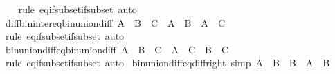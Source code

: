 \begin{isabellebody}
%
\isadelimproof
\ \ %
\endisadelimproof
%
\isatagproof
{}\isamarkupfalse%
\ {\isacharparenleft}{\kern0pt}rule\ eq{\isacharunderscore}{\kern0pt}if{\isacharunderscore}{\kern0pt}subset{\isacharunderscore}{\kern0pt}if{\isacharunderscore}{\kern0pt}subset{\isacharparenright}{\kern0pt}\ auto%
\endisatagproof
{\isafoldproof}%
%
\isadelimproof
\isanewline
%
\endisadelimproof
\isanewline
{}\isamarkupfalse%
\ diff{\isacharunderscore}{\kern0pt}bin{\isacharunderscore}{\kern0pt}inter{\isacharunderscore}{\kern0pt}eq{\isacharunderscore}{\kern0pt}bin{\isacharunderscore}{\kern0pt}union{\isacharunderscore}{\kern0pt}diff{\isacharcolon}{\kern0pt}\ {\isachardoublequoteopen}A\ {\isasymsetminus}\ {\isacharparenleft}{\kern0pt}B\ {\isasyminter}\ C{\isacharparenright}{\kern0pt}\ {\isacharequal}{\kern0pt}\ {\isacharparenleft}{\kern0pt}A\ {\isasymsetminus}\ B{\isacharparenright}{\kern0pt}\ {\isasymunion}\ {\isacharparenleft}{\kern0pt}A\ {\isasymsetminus}\ C{\isacharparenright}{\kern0pt}{\isachardoublequoteclose}\isanewline
%
\isadelimproof
\ \ %
\endisadelimproof
%
\isatagproof
{}\isamarkupfalse%
\ {\isacharparenleft}{\kern0pt}rule\ eq{\isacharunderscore}{\kern0pt}if{\isacharunderscore}{\kern0pt}subset{\isacharunderscore}{\kern0pt}if{\isacharunderscore}{\kern0pt}subset{\isacharparenright}{\kern0pt}\ auto%
\endisatagproof
{\isafoldproof}%
%
\isadelimproof
\isanewline
%
\endisadelimproof
\isanewline
{}\isamarkupfalse%
\ bin{\isacharunderscore}{\kern0pt}union{\isacharunderscore}{\kern0pt}diff{\isacharunderscore}{\kern0pt}eq{\isacharunderscore}{\kern0pt}bin{\isacharunderscore}{\kern0pt}union{\isacharunderscore}{\kern0pt}diff{\isacharcolon}{\kern0pt}\ {\isachardoublequoteopen}{\isacharparenleft}{\kern0pt}A\ {\isasymunion}\ B{\isacharparenright}{\kern0pt}\ {\isasymsetminus}\ C\ {\isacharequal}{\kern0pt}\ {\isacharparenleft}{\kern0pt}A\ {\isasymsetminus}\ C{\isacharparenright}{\kern0pt}\ {\isasymunion}\ {\isacharparenleft}{\kern0pt}B\ {\isasymsetminus}\ C{\isacharparenright}{\kern0pt}{\isachardoublequoteclose}\isanewline
%
\isadelimproof
\ \ %
\endisadelimproof
%
\isatagproof
{}\isamarkupfalse%
\ {\isacharparenleft}{\kern0pt}rule\ eq{\isacharunderscore}{\kern0pt}if{\isacharunderscore}{\kern0pt}subset{\isacharunderscore}{\kern0pt}if{\isacharunderscore}{\kern0pt}subset{\isacharparenright}{\kern0pt}\ auto%
\endisatagproof
{\isafoldproof}%
%
\isadelimproof
\isanewline
%
\endisadelimproof
\isanewline
{}\isamarkupfalse%
\ bin{\isacharunderscore}{\kern0pt}union{\isacharunderscore}{\kern0pt}diff{\isacharunderscore}{\kern0pt}eq{\isacharunderscore}{\kern0pt}diff{\isacharunderscore}{\kern0pt}right\ {\isacharbrackleft}{\kern0pt}simp{\isacharbrackright}{\kern0pt}{\isacharcolon}{\kern0pt}\ {\isachardoublequoteopen}{\isacharparenleft}{\kern0pt}A\ {\isasymunion}\ B{\isacharparenright}{\kern0pt}\ {\isasymsetminus}\ B\ {\isacharequal}{\kern0pt}\ A\ {\isasymsetminus}\ B{\isachardoublequoteclose}\isanewline

\end{isabellebody}

